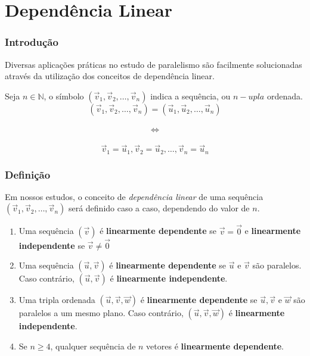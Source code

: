 \documentclass[hyperref={pdfpagelabels=false}]{beamer}
\begin{document}
\section{Dependência Linear}

\begin{frame}
\frametitle{Introdução}

Diversas aplicações práticas no estudo de paralelismo são facilmente solucionadas através da utilização dos conceitos de dependência linear. 

\pause

Seja $n \in \mathbb{N}$, o símbolo $(\overrightarrow{v}_1,\overrightarrow{v}_2, \dots, \overrightarrow{v}_n)$ indica a sequência, ou $n-upla$ ordenada.
$$(\overrightarrow{v}_1,\overrightarrow{v}_2, \dots, \overrightarrow{v}_n) = (\overrightarrow{u}_1,\overrightarrow{u}_2, \dots, \overrightarrow{u}_n)$$ \\ $$\Leftrightarrow$$ \\ $$\overrightarrow{v}_1 = \overrightarrow{u}_1, \overrightarrow{v}_2 = \overrightarrow{u}_2, \dots, \overrightarrow{v}_n = \overrightarrow{u}_n$$

\end{frame}

\begin{frame}
\frametitle{Definição}

Em nossos estudos, o conceito de \emph{dependência linear} de uma sequência $(\overrightarrow{v}_1,\overrightarrow{v}_2, \dots, \overrightarrow{v}_n)$ será definido caso a caso, dependendo do valor de $n$.

\begin{enumerate}
	\item Uma sequência $(\overrightarrow{v})$ é {\bf linearmente dependente} se $\overrightarrow{v} = \overrightarrow{0}$ e {\bf linearmente independente} se $\overrightarrow{v} \neq \overrightarrow{0}$
	\pause
	\item Uma sequência $(\overrightarrow{u},\overrightarrow{v})$ é {\bf linearmente dependente} se $\overrightarrow{u}$ e $\overrightarrow{v}$ são paralelos. Caso contrário, $(\overrightarrow{u},\overrightarrow{v})$ é {\bf linearmente independente}.
	\pause
	\item Uma tripla ordenada $(\overrightarrow{u}, \overrightarrow{v}, \overrightarrow{w})$ é {\bf linearmente dependente} se $\overrightarrow{u}, \overrightarrow{v}$ e $\overrightarrow{w}$ são paralelos a um mesmo plano. Caso contrário, $(\overrightarrow{u}, \overrightarrow{v}, \overrightarrow{w})$ é {\bf linearmente independente}.
	\pause
	\item Se $n \geq 4$, qualquer sequência de $n$ vetores é {\bf linearmente dependente}.
\end{enumerate}

\end{frame}
\end{document}
